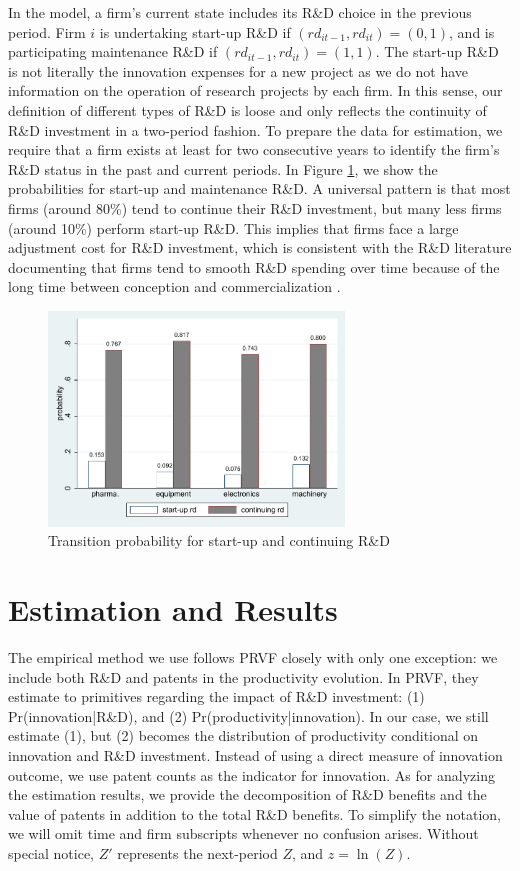 \documentclass[11pt]{article}
\begin{document}
In the model, a firm's current state includes its R\&D choice in the previous period.  Firm $i$ is undertaking start-up R\&D if $(rd_{it-1}, rd_{it})=(0, 1)$, and is participating maintenance R\&D if $(rd_{it-1}, rd_{it})=(1, 1)$. The start-up R\&D is not literally the innovation expenses for a new project as we do not have information on the operation of research projects by each firm. In this sense, our definition of different types of R\&D is loose and only reflects the continuity of R\&D investment in a two-period fashion. To prepare the data for estimation, we require that a firm exists at least for two consecutive years to identify the firm's R\&D status in the past and current periods. In Figure \ref{fig:rd_transition}, we show the probabilities for start-up and maintenance R\&D. A universal pattern is that most firms (around 80\%) tend to continue their R\&D investment, but many less firms (around 10\%) perform start-up R\&D. This implies that firms face a large adjustment cost for R\&D investment, which is consistent with the R\&D literature documenting that firms tend to smooth R\&D spending over time because of the long time between conception and commercialization \citep{hall1986patents,lach1989dynamics, hall2010handbook}.

\begin{figure}[h]
    \centering
    \caption{Transition probability for start-up and continuing R\&D}
    \label{fig:rd_transition}
    \includegraphics[width=0.7\textwidth]{Figs/rd_prob_transition.pdf}
\end{figure}


\section{Estimation and Results}
The empirical method we use follows PRVF closely with only one exception: we include both R\&D and patents in the productivity evolution. In PRVF, they estimate to primitives regarding the impact of R\&D investment: (1) Pr(innovation|R\&D), and (2) Pr(productivity|innovation). In our case, we still estimate (1), but (2) becomes the distribution of productivity conditional on innovation and R\&D investment. Instead of using a direct measure of innovation outcome, we use patent counts as the indicator for innovation. As for analyzing the estimation results, we provide the decomposition of R\&D benefits and the value of patents in addition to the total R\&D benefits. To simplify the notation, we will omit time and firm subscripts whenever no confusion arises. Without special notice, $Z'$ represents the next-period $Z$, and $z=\ln (Z)$.
\end{document}
